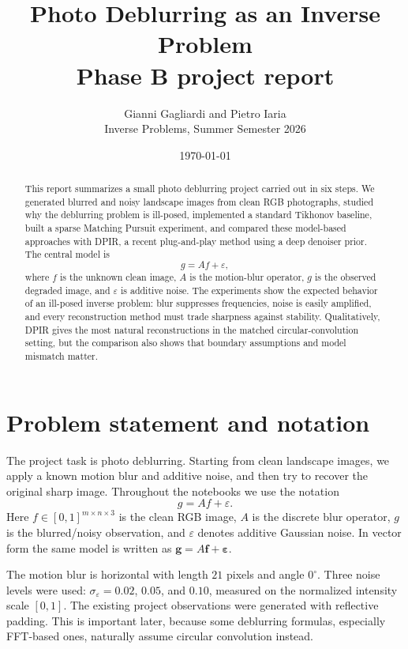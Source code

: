 \documentclass[11pt,a4paper]{article}
\title{Photo Deblurring as an Inverse Problem\\\large Phase B project report}
\author{Gianni Gagliardi and Pietro Iaria\\Inverse Problems, Summer Semester 2026}
\date{\today}
\newcommand{\eps}{\varepsilon}
\begin{document}
\maketitle

\begin{abstract}
This report summarizes a small photo deblurring project carried out in six steps. We generated blurred and noisy landscape images from clean RGB photographs, studied why the deblurring problem is ill-posed, implemented a standard Tikhonov baseline, built a sparse Matching Pursuit experiment, and compared these model-based approaches with DPIR, a recent plug-and-play method using a deep denoiser prior. The central model is
\[
  g = A f + \eps,
\]
where $f$ is the unknown clean image, $A$ is the motion-blur operator, $g$ is the observed degraded image, and $\eps$ is additive noise. The experiments show the expected behavior of an ill-posed inverse problem: blur suppresses frequencies, noise is easily amplified, and every reconstruction method must trade sharpness against stability. Qualitatively, DPIR gives the most natural reconstructions in the matched circular-convolution setting, but the comparison also shows that boundary assumptions and model mismatch matter.
\end{abstract}

\tableofcontents
\newpage

\section{Problem statement and notation}

The project task is photo deblurring. Starting from clean landscape images, we apply a known motion blur and additive noise, and then try to recover the original sharp image. Throughout the notebooks we use the notation
\begin{equation}
  g = A f + \eps.
  \label{eq:forward}
\end{equation}
Here $f \in [0,1]^{m \times n \times 3}$ is the clean RGB image, $A$ is the discrete blur operator, $g$ is the blurred/noisy observation, and $\eps$ denotes additive Gaussian noise. In vector form the same model is written as $\mathbf g = A \mathbf f + \boldsymbol\eps$.

The motion blur is horizontal with length $21$ pixels and angle $0^\circ$. Three noise levels were used: $\sigma_\eps = 0.02$, $0.05$, and $0.10$, measured on the normalized intensity scale $[0,1]$. The existing project observations were generated with reflective padding. This is important later, because some deblurring formulas, especially FFT-based ones, naturally assume circular convolution instead.
\end{document}
